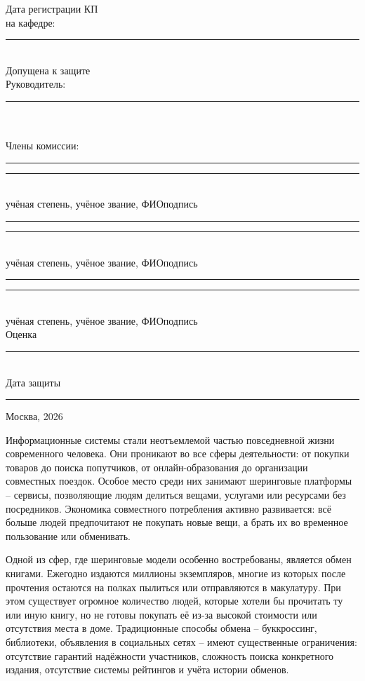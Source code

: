 \documentclass[14pt,a4paper]{extarticle}
\begin{document}
\begin{singlespace}
{\begin{minipage}[l]{0.5\textwidth}
Дата регистрации КП\\[1ex]
на кафедре: \rule{4cm}{0.4pt}\\[0.2cm]

Допущена к защите\\[0.2cm]
Руководитель:\\[0.3cm]
\rule{8cm}{0.4pt}\\
\hspace*{1cm}{\footnotesize учёная степень, учёное звание, ФИО}\\[0.5cm]

Члены комиссии:\\[0.2cm]
\rule{6cm}{0.4pt}\hfill\rule{2cm}{0.4pt}\\[-2pt]
{\footnotesize учёная степень, учёное звание, ФИО}\hfill{\footnotesize подпись}\\[0.2cm]
\rule{6cm}{0.4pt}\hfill\rule{2cm}{0.4pt}\\[-2pt]
{\footnotesize учёная степень, учёное звание, ФИО}\hfill{\footnotesize подпись}\\[0.2cm]
\rule{6cm}{0.4pt}\hfill\rule{2cm}{0.4pt}\\[-2pt]
{\footnotesize учёная степень, учёное звание, ФИО}\hfill{\footnotesize подпись}\\[0.5cm]

Оценка \rule{6cm}{0.4pt}\\[0.4cm]
Дата защиты \rule{5cm}{0.4pt}
\end{minipage}
}

\bigskip
\begin{center}
Москва, 2026
\end{center}

\end{singlespace}
\newpage

\tableofcontents
\newpage

\intro

Информационные системы стали неотъемлемой частью повседневной жизни
современного человека. Они проникают во все сферы деятельности: от
покупки товаров до поиска попутчиков, от онлайн-образования до
организации совместных поездок. Особое место среди них занимают
шеринговые платформы -- сервисы, позволяющие людям делиться вещами,
услугами или ресурсами без посредников. Экономика совместного
потребления активно развивается: всё больше людей предпочитают не
покупать новые вещи, а брать их во временное пользование или обменивать.

Одной из сфер, где шеринговые модели особенно востребованы, является
обмен книгами. Ежегодно издаются миллионы экземпляров, многие из которых
после прочтения остаются на полках пылиться или отправляются в
макулатуру. При этом существует огромное количество людей, которые
хотели бы прочитать ту или иную книгу, но не готовы покупать её из-за
высокой стоимости или отсутствия места в доме. Традиционные способы
обмена -- буккроссинг, библиотеки, объявления в социальных сетях --
имеют существенные ограничения: отсутствие гарантий надёжности
участников, сложность поиска конкретного издания, отсутствие системы
рейтингов и учёта истории обменов.
\end{document}
